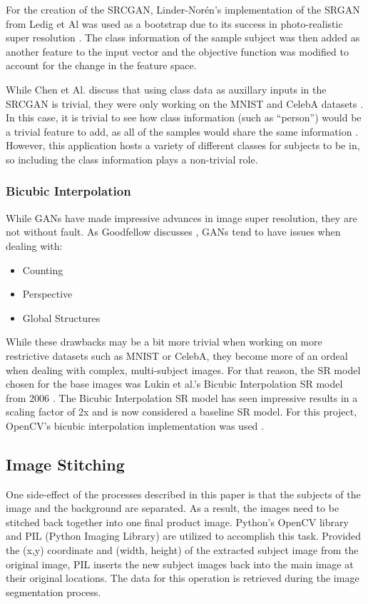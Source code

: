 For the creation of the SRCGAN, Linder-Norén’s implementation of the SRGAN
\cite{Linder-Noren} from Ledig et Al  was used as a bootstrap due to its success in
photo-realistic super resolution \cite{Ledig}. The class information of the sample
subject was then added as another feature to the input vector and the objective
function was modified to account for the change in the feature space.

While Chen et Al. discuss that using class data as auxillary inputs in the
SRCGAN is trivial, they were only working on the MNIST and CelebA datasets
\cite{Chen}. In this case, it is trivial to see how class information (such as
“person”) would be a trivial feature to add, as all of the samples would share
the same information \cite{Chen}. However, this application hosts a variety of
different classes for subjects to be in, so including the class information
plays a non-trivial role. \\

\subsubsection{Bicubic Interpolation}
While GANs have made impressive advances in image super resolution, they are not
without fault. As Goodfellow discusses \cite{Goodfellow2017}, GANs tend to have
issues when dealing with:

\begin{itemize}
	\item Counting
	\item Perspective
	\item Global Structures
\end{itemize}

While these drawbacks may be a bit more trivial when working on more restrictive
datasets such as MNIST or CelebA, they become more of an ordeal when dealing
with complex, multi-subject images. For that reason, the SR model chosen for the
base images was Lukin et al.’s Bicubic Interpolation SR model from 2006
\cite{Lukin2006}. The Bicubic Interpolation SR model has seen impressive results in a scaling
factor of 2x and is now considered a baseline SR model. For this project,
OpenCV’s bicubic interpolation implementation was used \cite{Bradski2000}.

\subsection{Image Stitching}
One side-effect of the processes described in this paper is that the subjects of
the image and the background are separated. As a result, the images need to be
stitched back together into one final product image. Python’s OpenCV library and
PIL (Python Imaging Library) are utilized to accomplish this task. Provided the
(x,y) coordinate and (width, height) of the extracted subject image from the
original image, PIL inserts the new subject images back into the main image at
their original locations. The data for this operation is retrieved during the
image segmentation process.

